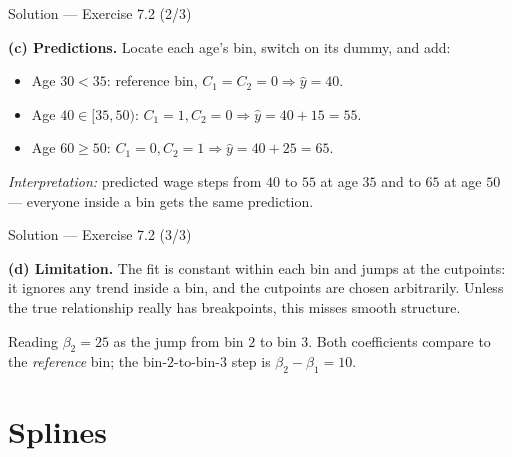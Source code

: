 \documentclass[aspectratio=169,11pt]{beamer}
\begin{document}
\begin{frame}{Solution --- Exercise 7.2 (2/3)}
\begin{solutionbox}
\textbf{(c) Predictions.} Locate each age's bin, switch on its dummy, and add:
\begin{itemize}
  \item Age $30<35$: reference bin, $C_1=C_2=0\Rightarrow \hat y=40$.
  \item Age $40\in[35,50)$: $C_1=1,C_2=0\Rightarrow \hat y=40+15=55$.
  \item Age $60\ge50$: $C_1=0,C_2=1\Rightarrow \hat y=40+25=65$.
\end{itemize}
\emph{Interpretation:} predicted wage steps from $40$ to $55$ at age $35$ and to $65$ at age $50$ --- everyone inside a bin gets the same prediction.
\end{solutionbox}
\end{frame}

\begin{frame}{Solution --- Exercise 7.2 (3/3)}
\begin{solutionbox}
\medskip
\textbf{(d) Limitation.} The fit is constant within each bin and jumps at the cutpoints: it ignores any trend inside a bin, and the cutpoints are chosen arbitrarily. Unless the true relationship really has breakpoints, this misses smooth structure.
\end{solutionbox}
\begin{mistake}
Reading $\beta_2=25$ as the jump from bin $2$ to bin $3$. Both coefficients compare to the \emph{reference} bin; the bin-$2$-to-bin-$3$ step is $\beta_2-\beta_1=10$.
\end{mistake}
\end{frame}



\section{Splines}
\end{document}
